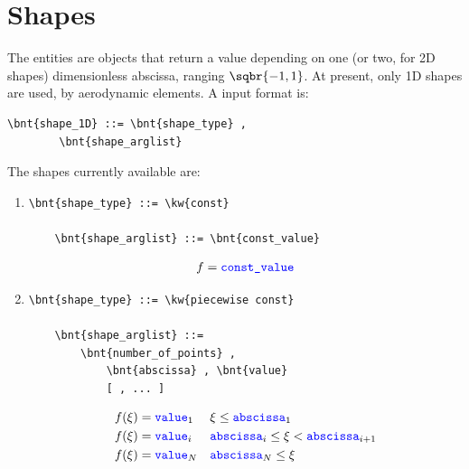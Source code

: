 \section{Shapes}
\label{sec:Shape}
The  entities are objects that return a value depending on one
(or two, for 2D shapes) dimensionless abscissa, ranging $ \sqbr{-1,1} $.
At present, only 1D shapes are used, by aerodynamic elements.
A  input format is:
\begin{Verbatim}[commandchars=\\\{\}]
    \bnt{shape_1D} ::= \bnt{shape_type} ,
        \bnt{shape_arglist}
\end{Verbatim}
The shapes currently available are:
\begin{enumerate}
    \item {}
\begin{Verbatim}[commandchars=\\\{\}]
    \bnt{shape_type} ::= \kw{const}

    \bnt{shape_arglist} ::= \bnt{const_value}
\end{Verbatim}
\begin{align}
	f = \textcolor{blue}{\texttt{const\_value}}
\end{align}

    \item {}
\begin{Verbatim}[commandchars=\\\{\}]
    \bnt{shape_type} ::= \kw{piecewise const}

    \bnt{shape_arglist} ::=
        \bnt{number_of_points} , 
            \bnt{abscissa} , \bnt{value}
            [ , ... ]
\end{Verbatim}
\begin{subequations}
\begin{align}
	f(\xi) &= \textcolor{blue}{\texttt{value}}_1	&& \xi \le \textcolor{blue}{\texttt{abscissa}}_1
	\\
	f(\xi) &= \textcolor{blue}{\texttt{value}}_i	&& \textcolor{blue}{\texttt{abscissa}}_i \le \xi < \textcolor{blue}{\texttt{abscissa}}_{i+1}
	\\
	f(\xi) &= \textcolor{blue}{\texttt{value}}_N	&& \textcolor{blue}{\texttt{abscissa}}_N \le \xi
\end{align}
\end{subequations}


\end{enumerate}
